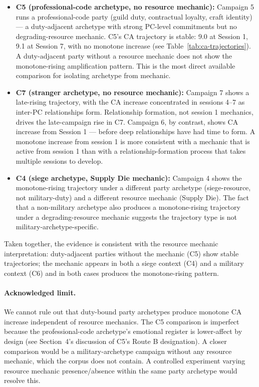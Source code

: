 \begin{itemize}
  \item \textbf{C5 (professional-code archetype, no resource mechanic):} Campaign 5
    runs a professional-code party (guild duty, contractual loyalty, craft identity) ---
    a duty-adjacent archetype with strong PC-level commitments but no degrading-resource
    mechanic. C5's CA trajectory is stable: 9.0 at Session 1, 9.1 at Session 7, with
    no monotone increase (see Table~\ref{tab:ca-trajectories}). A duty-adjacent party
    without a resource mechanic does not show the monotone-rising amplification pattern.
    This is the most direct available comparison for isolating archetype from mechanic.

  \item \textbf{C7 (stranger archetype, no resource mechanic):} Campaign 7 shows a
    late-rising trajectory, with the CA increase concentrated in sessions 4--7 as
    inter-PC relationships form. Relationship formation, not session 1 mechanics, drives
    the late-campaign rise in C7. Campaign 6, by contrast, shows CA increase from
    Session 1 --- before deep relationships have had time to form. A monotone increase
    from session 1 is more consistent with a mechanic that is active from session 1
    than with a relationship-formation process that takes multiple sessions to develop.

  \item \textbf{C4 (siege archetype, Supply Die mechanic):} Campaign 4 shows the
    monotone-rising trajectory under a different party archetype (siege-resource,
    not military-duty) and a different resource mechanic (Supply Die). The fact that
    a non-military archetype also produces a monotone-rising trajectory under a
    degrading-resource mechanic suggests the trajectory type is not military-archetype-specific.
\end{itemize}

Taken together, the evidence is consistent with the resource mechanic interpretation:
duty-adjacent parties without the mechanic (C5) show stable trajectories; the mechanic
appears in both a siege context (C4) and a military context (C6) and in both cases
produces the monotone-rising pattern.

\paragraph{Acknowledged limit.}
We cannot rule out that duty-bound party archetypes produce monotone CA increase
independent of resource mechanics. The C5 comparison is imperfect because the
professional-code archetype's emotional register is lower-affect by design (see
Section~4's discussion of C5's Route B designation). A closer comparison would be
a military-archetype campaign without any resource mechanic, which the corpus does not
contain. A controlled experiment varying resource mechanic presence/absence within
the same party archetype would resolve this.

